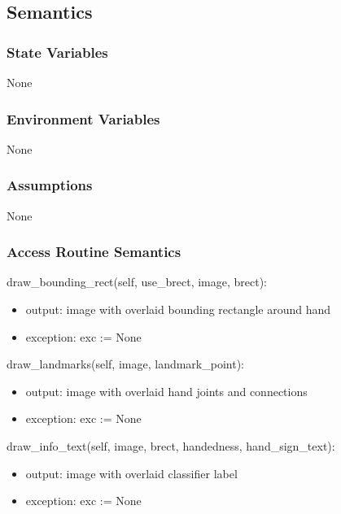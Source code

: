 \documentclass[12pt, titlepage]{article}
\begin{document}
\subsection{Semantics}

\subsubsection{State Variables}

None\\

\subsubsection{Environment Variables}

None\\

\subsubsection{Assumptions}

None

\subsubsection{Access Routine Semantics}

\noindent draw_bounding_rect(self, use_brect, image, brect):
\begin{itemize}
\item output: image with overlaid bounding rectangle around hand\\
\item exception: exc := None\\
\end{itemize}

\noindent draw_landmarks(self, image, landmark_point):
\begin{itemize}
\item output: image with overlaid hand joints and connections\\
\item exception: exc := None\\
\end{itemize}

\noindent draw_info_text(self, image, brect, handedness, hand_sign_text):
\begin{itemize}
\item output:  image with overlaid classifier label\\
\item exception: exc := None\\
\end{itemize}
\end{document}
